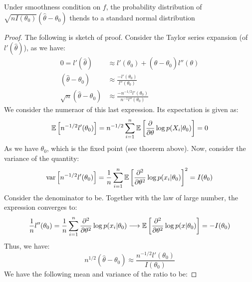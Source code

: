 \begin{theorem}
    Under smoothness condition on $f$, the probability distribution of $\sqrt{nI(\theta_0)}(\hat{\theta} - \theta_0)$ thends to a standard normal distribution
\end{theorem}
\begin{proof}
    The following is sketch of proof. Consider the Taylor series expansion (of $l'(\hat{\theta})$), as we have:
    \begin{equation*}
    \begin{aligned}
        0 = l'(\hat{\theta}) &\approx l'(\theta_0) + (\hat{\theta} - \theta_0)l''(\theta) \\
        (\hat{\theta} - \theta_0)&\approx \frac{-l'(\theta_0)}{l''(\theta_0)} \\
        \sqrt{n}(\hat{\theta} - \theta_0) &\approx\frac{-{n}^{-1/2}l'(\theta_0)}{n^{-1}l''(\theta_0)}
    \end{aligned}
    \end{equation*}
    We consider the numeraor of this last expression. Its expectation is given as:
    \begin{equation*}
    \begin{aligned}
        \mathbb{E}\left[ n^{-1/2}l'(\theta_0) \right] = n^{-1/2}\sum^n_{i=1}\mathbb{E}\left[ \frac{\partial}{\partial\theta}\log p(X_i | \theta_0) \right] = 0
    \end{aligned}
    \end{equation*}
    As we have $\theta_0$, which is the fixed point (see thoerem above). Now, consider the variance of the quantity:
    \begin{equation*}
        \operatorname{var}\left[ n^{-1/2} l'(\theta_0) \right] = \frac{1}{n}\sum^n_{i=1}\mathbb{E}\left[ \frac{\partial^2}{\partial \theta^2} \log p(x_i | \theta_0)  \right]^2 = I(\theta_0)
    \end{equation*}
    Consider the denominator to be. Together with the law of large number, the expression converges to:
    \begin{equation*}
        \frac{1}{n} l''(\theta_0) = \frac{1}{n}\sum^n_{i=1}\frac{\partial^2}{\partial\theta^2} \log p(x_i|\theta_0) \longrightarrow \mathbb{E}\left[ \frac{\partial^2}{\partial\theta^2}\log p(x|\theta_0) \right] = -I(\theta_0)
    \end{equation*}
    Thus, we have:
    \begin{equation*}
        n^{1/2}(\hat{\theta} - \theta_0) \approx \frac{n^{-1/2}l'(\theta_0)}{I(\theta_0)}
    \end{equation*}
    We have the following mean and variance of the ratio to be:

\end{proof}
